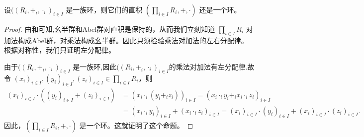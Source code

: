 \documentclass[../../main.tex]{subfiles}
\begin{document}
\begin{proposition}[环的直积仍是环]\label{proposition:环的直积仍是环}
设$((R_i, +_i, \cdot_i)_{i \in I}$ 是一族环，则它们的直积 $(\prod_{i \in I} R_i, +, \cdot)$ 还是一个环。
\end{proposition}
\begin{proof}
由和可知,幺半群和Abel群对直积是保持的，从而我们立刻知道 $\prod_{i \in I} R_i$ 对加法构成Abel群，对乘法构成幺半群。因此只须检验乘法对加法的左右分配律。根据对称性，我们只证明左分配律。

由于$((R_i, +_i, \cdot_i)_{i \in I}$ 是一族环,因此$((R_i, +_i, \cdot_i)_{i \in I}$的乘法对加法有左分配律.故令 $(x_i)_{i \in I}, (y_i)_{i \in I}, (z_i)_{i \in I} \in \prod_{i \in I} R_i$，则
\begin{align*}
(x_i)_{i\in I}\cdot ((y_i)_{i\in I}+(z_i)_{i\in I})&=(x_i\cdot _i(y_i+_iz_i))_{i\in I}=(x_i\cdot _iy_i+_ix_i\cdot _iz_i)_{i\in I}\\
&=(x_i\cdot _iy_i)_{i\in I}+(x_i\cdot _iz_i)_{i\in I}=(x_i)_{i\in I}\cdot (y_i)_{i\in I}+(x_i)_{i\in I}\cdot (z_i)_{i\in I}.
\end{align*}
因此，$(\prod_{i \in I} R_i, +, \cdot)$ 是一个环。这就证明了这个命题。 
\end{proof}
\end{document}
